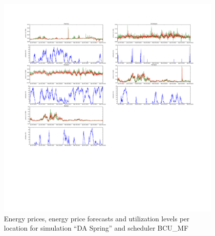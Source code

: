 \begin{figure}[htbp]
	\centering
	\vspace*{-0.6in}
	\hspace*{-1.9in}
		\includegraphics[width=1.60\textwidth]{figures/appendix_simulation_results/DA_Spring_scenario_6.pdf}
	\vspace*{-2.8in}
	\caption{Energy prices, energy price forecasts and utilization levels per location for simulation ``DA Spring'' and scheduler BCU\_MF}
	\label{fig:app_DA_Spring_scenario_6}
\end{figure}

